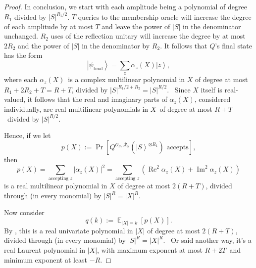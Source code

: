 \documentclass[10pt,a4paper]{article}
\newcommand{\<}{\langle}
\renewcommand{\>}{\rangle}
\DeclareMathOperator{\E}{\mathbb E}
\newcommand{\R}{\mathcal R}
\begin{document}
\begin{proof}
In conclusion, we start with each amplitude being a polynomial of degree $R_1$ divided by $|S|^{R_1/2}$. $T$ queries to the membership oracle will increase the degree of each amplitude by at most $T$ and leave the power of $|S|$ in the denominator unchanged. $R_2$ uses of the reflection unitary will increase the degree by at most $2R_2$ and the power of $|S|$ in the denominator by $R_2$. It follows that $Q$'s final state has the form
\begin{equation}
\left\vert \psi_\mathrm{final}\right\rangle =\sum_z \alpha_{z}\left(  X\right)
\left\vert z\right\rangle ,
\end{equation}
where each $\alpha_{z}\left(  X\right)  $\ is a complex multilinear polynomial
in $X$ of degree at most $R_1+2R_2+T = R+T$, divided by $\left\vert S\right\vert
^{R_1/2+R_2} = |S|^{R/2}$. \ Since $X$ itself is real-valued, it follows that the real and
imaginary parts of $\alpha_{z}\left(  X\right)  $, considered individually,
are real multilinear polynomials in $X$\ of degree at most $R+T$\ divided by
$\left\vert S\right\vert ^{R/2}$.

Hence, if we let
\begin{equation}
p\left(  X\right)  :=\Pr\left[  Q^{\mathcal{O}_{S},\R_S}\left(  \left\vert
S\right\rangle ^{\otimes R_1}\right)  \text{ accepts}\right]  ,
\end{equation}
then
\begin{equation}
p\left(  X\right)  =\sum_{\text{accepting }z}\left\vert \alpha_{z}\left(
X\right)  \right\vert ^{2}=\sum_{\text{accepting }z}\left(  \operatorname{Re}
^{2}\alpha_{z}\left(  X\right)  +\operatorname{Im}^{2}\alpha_{z}\left(
X\right)  \right)
\end{equation}
is a real multilinear polynomial in $X$ of degree at most $2\left(
R+T\right)  $, divided through (in every monomial) by $\left\vert S\right\vert
^{R}=\left\vert X\right\vert ^{R}$.

Now consider
\begin{equation}
q\left(  k\right)  :=\E_{\left\vert X\right\vert =k}\left[
p\left(  X\right)  \right]  .
\end{equation}
By , this is a real univariate polynomial in $\left\vert
X\right\vert $ of degree at most $2\left(  R+T\right)  $, divided through (in
every monomial) by $\left\vert S\right\vert ^{R}=\left\vert X\right\vert ^{R}
$. \ Or said another way, it's a real Laurent polynomial in $\left\vert
X\right\vert $, with maximum exponent at most $R+2T$\ and minimum exponent at
least $-R$.
\end{proof}
\end{document}
